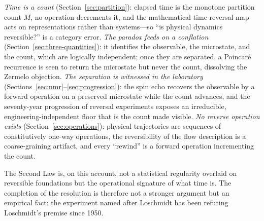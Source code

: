 \documentclass[11pt,a4paper]{article}
\theoremstyle{thmstyle}
\theoremstyle{definition}
\theoremstyle{remark}
\newcommand{\Count}{M}
\begin{document}
\emph{Time is a count} (Section~\ref{sec:partition}): elapsed time is the
monotone partition count $\Count$, no operation decrements it, and the
mathematical time-reversal map acts on representations rather than
systems---so ``is physical dynamics reversible?'' is a category error.
\emph{The paradox feeds on a conflation}
(Section~\ref{sec:three-quantities}): it identifies the observable, the
microstate, and the count, which are logically independent; once they are
separated, a Poincar\'e recurrence is seen to return the microstate but
never the count, dissolving the Zermelo objection. \emph{The separation
is witnessed in the laboratory}
(Sections~\ref{sec:nmr}--\ref{sec:progression}): the spin echo recovers
the observable by a forward operation on a preserved microstate while the
count advances, and the seventy-year progression of reversal experiments
exposes an irreducible, engineering-independent floor that is the count
made visible. \emph{No reverse operation exists}
(Section~\ref{sec:operations}): physical trajectories are sequences of
constitutively one-way operations, the reversibility of the flow
description is a coarse-graining artifact, and every ``rewind'' is a
forward operation incrementing the count.

The Second Law is, on this account, not a statistical regularity
overlaid on reversible foundations but the operational signature of what
time is. The completion of the resolution is therefore not a stronger
argument but an empirical fact: the experiment named after Loschmidt has
been refuting Loschmidt's premise since 1950.



\end{document}
